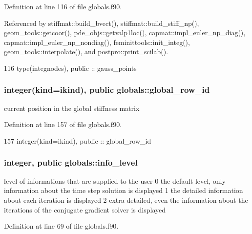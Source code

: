 Definition at line 116 of file globals.\+f90.



Referenced by stiffmat\+::build\+\_\+bvect(), stiffmat\+::build\+\_\+stiff\+\_\+np(), geom\+\_\+tools\+::getcoor(), pde\+\_\+objs\+::getvalp1loc(), capmat\+::impl\+\_\+euler\+\_\+np\+\_\+diag(), capmat\+::impl\+\_\+euler\+\_\+np\+\_\+nondiag(), feminittools\+::init\+\_\+integ(), geom\+\_\+tools\+::interpolate(), and postpro\+::print\+\_\+scilab().


\begin{DoxyCode}
116   \textcolor{keywordtype}{type}(integnodes),  \textcolor{keywordtype}{public} :: gauss_points
\end{DoxyCode}
\subsubsection[{global\+\_\+row\+\_\+id}]{\setlength{\rightskip}{0pt plus 5cm}integer(kind=ikind), public globals\+::global\+\_\+row\+\_\+id}\label{namespaceglobals_a8e84a59697d0e67889b563a541c8016f}


current position in the global stiffness matrix 



Definition at line 157 of file globals.\+f90.


\begin{DoxyCode}
157   \textcolor{keywordtype}{integer(kind=ikind)}, \textcolor{keywordtype}{public} :: global_row_id
\end{DoxyCode}
\subsubsection[{info\+\_\+level}]{\setlength{\rightskip}{0pt plus 5cm}integer, public globals\+::info\+\_\+level}\label{namespaceglobals_a2802bf59caeb18483b4d360d6ef94fc4}


level of informations that are supplied to the user 0 the default level, only information about the time step solution is displayed 1 the detailed information about each iteration is displayed 2 extra detailed, even the information about the iterations of the conjugate gradient solver is displayed 



Definition at line 69 of file globals.\+f90.


